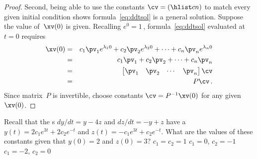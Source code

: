 \begin{proof}
\begin{comment}
Straightforward substitution is simpler, but the above reinforces the simplification through diagonalization.
\end{comment}

Second, being able to use the constants \(\cv=(\hlist cn)\) to match every given initial condition shows formula~\eqref{eq:ddtsol} is a general solution.
Suppose the value of~\(\xv(0)\) is given.
Recalling \(e^0=1\)\,, formula~\eqref{eq:ddtsol} evaluated at \(t=0\)  requires
\begin{eqnarray*}
\xv(0)&=&c_1\pv_1e^{\lambda_10}+c_2\pv_2e^{\lambda_20}+\cdots+c_n\pv_ne^{\lambda_n0}
\\&=&c_1\pv_1+c_2\pv_2+\cdots+c_n\pv_n
\\&=&\begin{bmatrix} \pv_1&\pv_2&\cdots&\pv_n \end{bmatrix}\cv
\\&=&P\cv\,.
\end{eqnarray*}
Since matrix~\(P\) is invertible, choose constants \(\cv=P^{-1}\xv(0)\) for any given~\(\xv(0)\).
\end{proof}





\begin{activity}
Recall that the s \(dy/dt=y-4z\) and \(dz/dt=-y+z\) have a  \(y(t)=2c_1e^{3t}+2c_2e^{-t}\) and \(z(t)=-c_1e^{3t}+c_2e^{-t}\).
What are the values of these constants given that \(y(0)=2\) and \(z(0)=3\)?
{\(c_1=c_2=1\)}
{\(c_1=0\), \(c_2=-1\)}
{\(c_1=-2\), \(c_2=0\)}
\end{activity}




